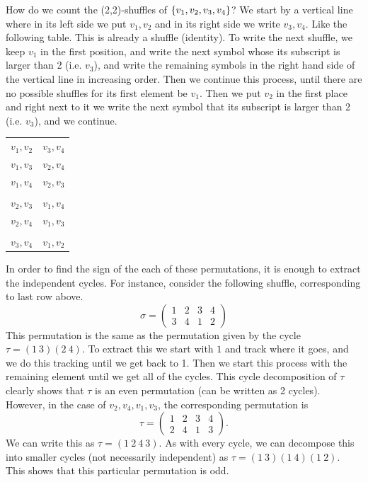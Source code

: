 \begin{observation}
	How do we count the (2,2)-shuffles of $ \{v_1,v_2,v_3,v_4\} $? We start by a vertical line where in its left side we put $ v_1,v_2 $ and in its right side we write $ v_3,v_4 $. Like the following table. This is already a shuffle (identity). To write the next shuffle, we keep $ v_1 $ in the first position, and write the next symbol whose its subscript is larger than 2 (i.e. $ v_3 $), and write the remaining symbols in the right hand side of the vertical line in increasing order. Then we continue this process, until there are no possible shuffles for its first element be $ v_1 $. Then we put $ v_2 $ in the first place and right next to it we write the next symbol that its subscript is larger than 2 (i.e. $ v_3 $), and we continue.

	\begin{center}
		\begin{tabular}{c|c}
			$ v_1,v_2 $ & $ v_3,v_4 $  \\
			$ v_1,v_3 $ & $ v_2,v_4 $ \\
			$ v_1,v_4 $ & $ v_2,v_3 $ \\
			& \\
			$ v_2,v_3 $ & $ v_1,v_4 $ \\
			$ v_2,v_4 $ & $ v_1,v_3 $ \\
			& \\
			$ v_3,v_4 $ & $ v_1,v_2 $ \\
		\end{tabular}
	\end{center}
	
	In order to find the sign of the each of these permutations, it is enough to extract the independent cycles. For instance, consider the following shuffle, corresponding to last row above.
	\[ \sigma = \begin{pmatrix}
		1 & 2 & 3 & 4 \\
		3 & 4 & 1 & 2
	\end{pmatrix}  \]
	This permutation is the same as the permutation given by the cycle $ \tau = (1\ 3)(2\ 4) $. To extract this we start with $ 1 $ and track where it goes, and we do this tracking until we get back to 1. Then we start this process with the remaining element until we get all of the cycles. This cycle decomposition of $ \tau $ clearly shows that $  \tau $ is an even permutation (can be written as 2 cycles). However, in the case of $ v_2,v_4,v_1,v_3 $, the corresponding permutation is 
	\[ \tau = 
	\begin{pmatrix}
		1 & 2 & 3 & 4 \\
		2 & 4 & 1 & 3
	\end{pmatrix}.
	 \]
	 We can write this as $ \tau = (1\ 2\ 4\ 3) $. As with every cycle, we can decompose this into smaller cycles (not necessarily independent) as $ \tau = (1\ 3)(1\ 4)(1\ 2) $. This shows that this particular permutation is odd.
	
\end{observation}

